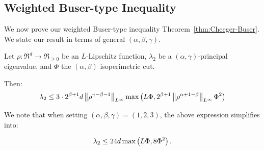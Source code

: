\subsection{Weighted Buser-type Inequality}

We now prove our weighted Buser-type inequality
Theorem~\ref{thm:Cheeger-Buser}. We state our result in terms of
general $(\alpha, \beta, \gamma)$.

\begin{theorem}
  \label{thm:buser_n}
  Let $\rho: \Re^d \to \Re_{\geq 0}$ be an $L$-Lipschitz function,
  $\lambda_2$ be a $(\alpha, \gamma)$-principal eigenvalue, and
  $\Phi$ the $(\alpha, \beta)$ isoperimetric cut.

  Then:
  \begin{align*}
    \lambda_2 \leq 3 \cdot 2^{\beta + 1} d \linf{\rho^{\gamma-\beta-1}}
    \max\left(L \Phi, 2^{\beta+1}\linf{\rho^{\alpha+1-\beta}} \Phi^2 \vph\right)
\end{align*}
\end{theorem}

We note that when setting $(\alpha, \beta, \gamma) = (1,2,3)$,
the above expression simplifies into:

\begin{align*}
  \lambda_2 \leq 24 d 
  \max\left(L \Phi, 8 \Phi^2 \vph\right).
\end{align*}




